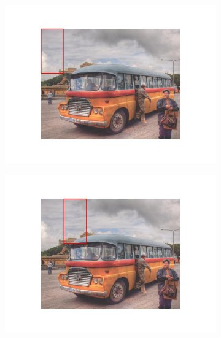 \documentclass{article}
\begin{document}
\begin{figure}[h]
  \begin{subfigure}{0.48\textwidth}
    \includegraphics[width=\linewidth]{sliding_window_a.jpg}
    \caption{}
  \end{subfigure}
  \hspace*{\fill} %
  \begin{subfigure}{0.48\textwidth}
    \includegraphics[width=\linewidth]{sliding_window_b.jpg}
    \caption{}
  \end{subfigure}
  \hspace*{\fill} %
  \begin{subfigure}{0.48\textwidth}

\end{subfigure}
\end{figure}
\end{document}
